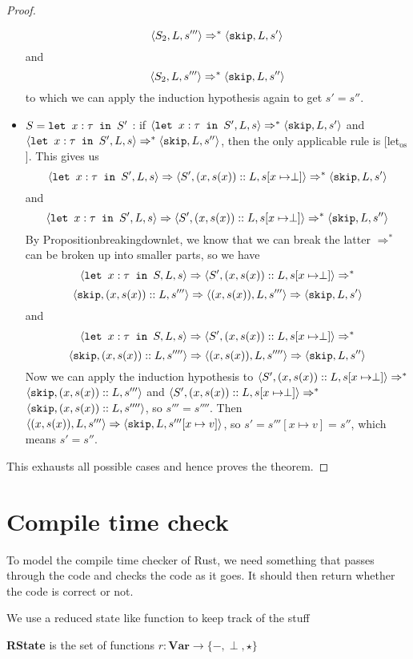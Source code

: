 \begin{proof}
\begin{itemize}[noitemsep]
     $$\langle S_2, L, s''' \rangle \Rightarrow ^{*} \langle \texttt{skip}, L, s' \rangle$$
     and 
     $$\langle S_2, L, s''' \rangle \Rightarrow ^{*} \langle \texttt{skip}, L, s'' \rangle$$
     to which we can apply the induction hypothesis again to get $s' = s''$.
    \item $S = \texttt{let }x : \tau \texttt{ in } S'$ : if $\langle \texttt{let }x : \tau \texttt{ in } S', L, s \rangle \Rightarrow ^{*} \langle \texttt{skip}, L, s' \rangle$ and $\langle \texttt{let }x : \tau \texttt{ in } S', L, s \rangle \Rightarrow ^{*} \langle \texttt{skip}, L, s'' \rangle$, then the only applicable rule is [let$_{\textrm{os}}$]. This gives us
    $$\langle \texttt{let }x : \tau \texttt{ in } S', L, s \rangle \Rightarrow \langle S', (x,s(x))::L, s[x\mapsto \perp] \rangle \Rightarrow ^{*} \langle \texttt{skip}, L, s' \rangle$$
    and 
    $$\langle \texttt{let }x : \tau \texttt{ in } S', L, s \rangle \Rightarrow \langle S', (x,s(x))::L, s[x\mapsto \perp] \rangle \Rightarrow ^{*} \langle \texttt{skip}, L, s'' \rangle$$
    By Proposition{breakingdownlet}, we know that we can break the latter $\Rightarrow ^{*}$ can be broken up into smaller parts, so we have 
    $$\langle \texttt{let }x : \tau \texttt{ in } S, L, s \rangle \Rightarrow \langle S', (x,s(x))::L, s[x\mapsto \perp] \rangle \Rightarrow ^{*}$$ $$\langle \texttt{skip}, (x,s(x))::L, s''' \rangle \Rightarrow \langle (x,s(x)), L, s''' \rangle \Rightarrow \langle \texttt{skip}, L, s' \rangle$$
    and 
    $$\langle \texttt{let }x : \tau \texttt{ in } S, L, s \rangle \Rightarrow \langle S', (x,s(x))::L, s[x\mapsto \perp] \rangle \Rightarrow ^{*}$$ $$\langle \texttt{skip}, (x,s(x))::L, s'''' \rangle \Rightarrow \langle (x,s(x)), L, s'''' \rangle \Rightarrow \langle \texttt{skip}, L, s'' \rangle$$
    Now we can apply the induction hypothesis to $\langle S', (x,s(x))::L, s[x\mapsto \perp] \rangle \Rightarrow ^{*}$$ $$\langle \texttt{skip}, (x,s(x))::L, s''' \rangle$ and $\langle S', (x,s(x))::L, s[x\mapsto \perp] \rangle \Rightarrow ^{*}$$ $$\langle \texttt{skip}, (x,s(x))::L, s'''' \rangle$, so $s''' = s''''$. Then $\langle (x,s(x)), L, s''' \rangle \Rightarrow \langle \texttt{skip}, L, s'''[x\mapsto v] \rangle$, so $s' = s'''[x\mapsto v] = s''$, which means $s'=s''$.
\end{itemize}
This exhausts all possible cases and hence proves the theorem.
\end{proof}


\section{Compile time check}
To model the compile time checker of Rust, we need something that passes through the code and checks the code as it goes. It should then return whether the code is correct or not. 

We use a reduced state like function to keep track of the stuff

\begin{definition}
\textbf{RState} is the set of functions $r: \textbf{Var} \to \{-, \perp, \star \}$
\end{definition}

